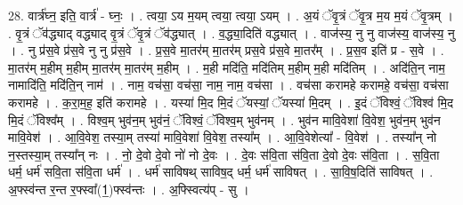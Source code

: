 \documentclass[17pt]{extarticle}
\begin{document}
28. वार्त्र॑घ्न॒ इति॒ वार्त्र॑ - घ्नः॒ । . त्वया॒ ऽय म॒यम् त्वया॒ त्वया॒ ऽयम् । . अ॒यं ॅवृ॒त्रं ॅवृ॒त्र म॒य म॒यं ॅवृ॒त्रम् । . वृ॒त्रं ॅव॑द्ध्याद् वद्ध्याद् वृ॒त्रं ॅवृ॒त्रं ॅव॑द्ध्यात् । . व॒द्ध्या॒दिति॑ वद्ध्यात् । . वाज॑स्य॒ नु नु वाज॑स्य॒ वाज॑स्य॒ नु । . नु प्र॑स॒वे प्र॑स॒वे नु नु प्र॑स॒वे । . प्र॒स॒वे मा॒तर॑म् मा॒तर॑म् प्रस॒वे प्र॑स॒वे मा॒तर᳚म् । . प्र॒स॒व इति॑ प्र - स॒वे । . मा॒तर॑म् म॒हीम् म॒हीम् मा॒तर॑म् मा॒तर॑म् म॒हीम् । . म॒ही मदि॑ति॒ मदि॑तिम् म॒हीम् म॒ही मदि॑तिम् । . अदि॑ति॒न् नाम॒ नामादि॑ति॒ मदि॑ति॒न् नाम॑ । . नाम॒ वच॑सा॒ वच॑सा॒ नाम॒ नाम॒ वच॑सा । . वच॑सा करामहे करामहे॒ वच॑सा॒ वच॑सा करामहे । . क॒रा॒म॒ह॒ इति॑ करामहे । . यस्या॑ मि॒द मि॒दं ॅयस्यां॒ ॅयस्या॑ मि॒दम् । . इ॒दं ॅविश्वं॒ ॅविश्व॑ मि॒द मि॒दं ॅविश्व᳚म् । . विश्व॒म् भुव॑न॒म् भुव॑नं॒ ॅविश्वं॒ ॅविश्व॒म् भुव॑नम् । . भुव॑न मावि॒वेशा॑ वि॒वेश॒ भुव॑न॒म् भुव॑न मावि॒वेश॑ । . आ॒वि॒वेश॒ तस्या॒म् तस्या॑ मावि॒वेशा॑ वि॒वेश॒ तस्या᳚म् । . आ॒वि॒वेशेत्या᳚ - वि॒वेश॑ । . तस्या᳚न् नो न॒स्तस्या॒म् तस्या᳚न् नः । . नो॒ दे॒वो दे॒वो नो॑ नो दे॒वः । . दे॒वः स॑वि॒ता स॑वि॒ता दे॒वो दे॒वः स॑वि॒ता । . स॒वि॒ता धर्म॒ धर्म॑ सवि॒ता स॑वि॒ता धर्म॑ । . धर्म॑ साविषथ् साविष॒द् धर्म॒ धर्म॑ साविषत् । . सा॒वि॒ष॒दिति॑ साविषत् । . अ॒फ्स्व॑न्त र॒न्त र॒फ्स्वा᳚(1॒)फ्स्व॑न्तः । . अ॒फ्स्वित्य॑प् - सु । \newline
\end{document}
